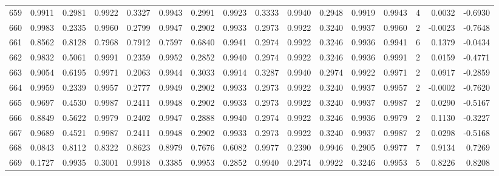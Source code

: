 \begin{tabular}{lrrrrrrrrrrrrrrr}
659 &      0.9911 &  0.2981 &  0.9922 &  0.3327 &  0.9943 &  0.2991 &  0.9923 &  0.3333 &  0.9940 &  0.2948 &   0.9919 &     0.9943 &      4 &                    0.0032 &                    -0.6930 \\
660 &      0.9983 &  0.2335 &  0.9960 &  0.2799 &  0.9947 &  0.2902 &  0.9933 &  0.2973 &  0.9922 &  0.3240 &   0.9937 &     0.9960 &      2 &                   -0.0023 &                    -0.7648 \\
661 &      0.8562 &  0.8128 &  0.7968 &  0.7912 &  0.7597 &  0.6840 &  0.9941 &  0.2974 &  0.9922 &  0.3246 &   0.9936 &     0.9941 &      6 &                    0.1379 &                    -0.0434 \\
662 &      0.9832 &  0.5061 &  0.9991 &  0.2359 &  0.9952 &  0.2852 &  0.9940 &  0.2974 &  0.9922 &  0.3246 &   0.9936 &     0.9991 &      2 &                    0.0159 &                    -0.4771 \\
663 &      0.9054 &  0.6195 &  0.9971 &  0.2063 &  0.9944 &  0.3033 &  0.9914 &  0.3287 &  0.9940 &  0.2974 &   0.9922 &     0.9971 &      2 &                    0.0917 &                    -0.2859 \\
664 &      0.9959 &  0.2339 &  0.9957 &  0.2777 &  0.9949 &  0.2902 &  0.9933 &  0.2973 &  0.9922 &  0.3240 &   0.9937 &     0.9957 &      2 &                   -0.0002 &                    -0.7620 \\
665 &      0.9697 &  0.4530 &  0.9987 &  0.2411 &  0.9948 &  0.2902 &  0.9933 &  0.2973 &  0.9922 &  0.3240 &   0.9937 &     0.9987 &      2 &                    0.0290 &                    -0.5167 \\
666 &      0.8849 &  0.5622 &  0.9979 &  0.2402 &  0.9947 &  0.2888 &  0.9940 &  0.2974 &  0.9922 &  0.3246 &   0.9936 &     0.9979 &      2 &                    0.1130 &                    -0.3227 \\
667 &      0.9689 &  0.4521 &  0.9987 &  0.2411 &  0.9948 &  0.2902 &  0.9933 &  0.2973 &  0.9922 &  0.3240 &   0.9937 &     0.9987 &      2 &                    0.0298 &                    -0.5168 \\
668 &      0.0843 &  0.8112 &  0.8322 &  0.8623 &  0.8979 &  0.7676 &  0.6082 &  0.9977 &  0.2390 &  0.9946 &   0.2905 &     0.9977 &      7 &                    0.9134 &                     0.7269 \\
669 &      0.1727 &  0.9935 &  0.3001 &  0.9918 &  0.3385 &  0.9953 &  0.2852 &  0.9940 &  0.2974 &  0.9922 &   0.3246 &     0.9953 &      5 &                    0.8226 &                     0.8208 \\

\end{tabular}
